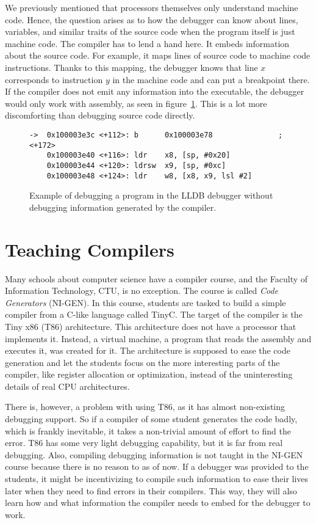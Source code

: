 We previously mentioned that processors themselves only understand machine
code. Hence, the question arises as to how the debugger can know about lines,
variables, and similar traits of the source code when the program itself is
just machine code. The compiler has to lend a hand here. It embeds information
about the source code. For example, it maps lines of source code to machine
code instructions. Thanks to this mapping, the debugger knows that line $x$
corresponds to instruction $y$ in the machine code and can put a breakpoint
there. If the compiler does not emit any information into the executable, the
debugger would only work with assembly, as seen in
figure~\ref{fig:lldb-debug2}. This is a lot more discomforting than debugging
source code directly.

\begin{figure}
\begin{lstlisting}
->  0x100003e3c <+112>: b      0x100003e78               ; <+172>
    0x100003e40 <+116>: ldr    x8, [sp, #0x20]
    0x100003e44 <+120>: ldrsw  x9, [sp, #0xc]
    0x100003e48 <+124>: ldr    w8, [x8, x9, lsl #2]
\end{lstlisting}
\caption{Example of debugging a program in the LLDB debugger without debugging
    information generated by the compiler.}
\label{fig:lldb-debug2}
\end{figure}

\section{Teaching Compilers}
Many schools about computer science have a compiler course, and the Faculty of
Information Technology, CTU, is no exception. The course is called \textit{Code
Generators} (NI-GEN). In this course, students are tasked to build a simple
compiler from a C-like language called TinyC. The target of the compiler is the
Tiny x86 (T86) architecture. This architecture does not have a processor that
implements it. Instead, a virtual machine, a program that reads the assembly
and executes it, was created for it. The architecture is supposed to ease the
code generation and let the students focus on the more interesting parts of the
compiler, like register allocation or optimization, instead of the
uninteresting details of real CPU architectures.

There is, however, a problem with using T86, as it has almost non-existing
debugging support. So if a compiler of some student generates the code badly,
which is frankly inevitable, it takes a non-trivial amount of effort to find
the error. T86 has some very light debugging capability, but it is far from
real debugging. Also, compiling debugging information is not taught in the
NI-GEN course because there is no reason to as of now. If a debugger was
provided to the students, it might be incentivizing to compile such information
to ease their lives later when they need to find errors in their compilers.
This way, they will also learn how and what information the compiler needs to
embed for the debugger to work.

